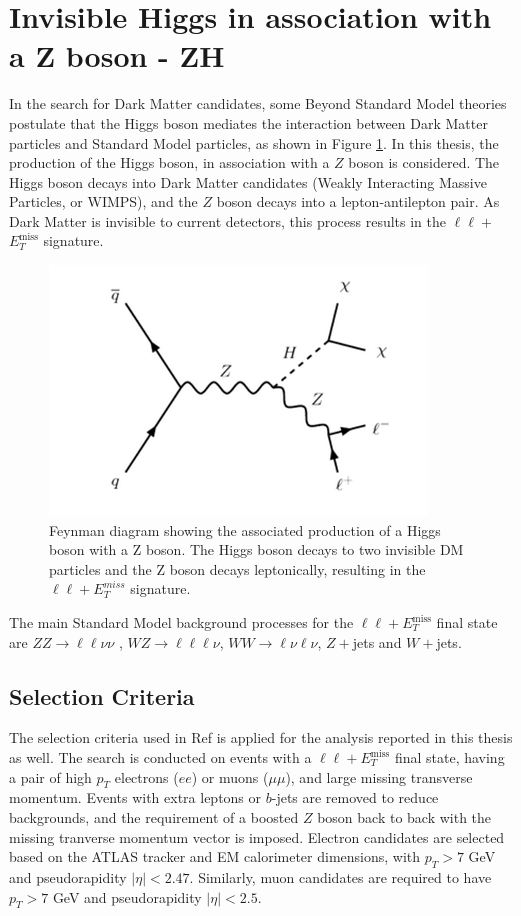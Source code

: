 \documentclass[12pt,a4paper,openright,twoside]{report}
\newcommand{\ZZ}{$ZZ\to \ell\ell\nu\nu$ }
\newcommand{\met}{$E_T^{\mathrm{miss}}$ }
\begin{document}
\section{Invisible Higgs in association with a Z boson - ZH}
In the search for Dark Matter candidates, some Beyond Standard Model theories postulate that the Higgs boson mediates the interaction between Dark Matter particles and Standard Model particles, as shown in Figure \ref{fig:HZ}. In this thesis, the production of the Higgs boson, in association with a $Z$ boson is considered. The Higgs boson decays into Dark Matter candidates (Weakly Interacting Massive Particles, or WIMPS), and the $Z$ boson decays into a lepton-antilepton pair. As Dark Matter is invisible to current detectors, this process results in the $\ell\ell+$\met signature.
\begin{figure}[H]
\centering
	\includegraphics[width=0.5\linewidth]{HZ.png}
	\caption{Feynman diagram showing the associated production of a Higgs boson with a Z boson. The Higgs boson decays to two invisible DM particles and the Z boson decays leptonically, resulting in the $\ell\ell+ E_T^{miss}$ signature.}
		\label{fig:HZ}
\end{figure}
The main Standard Model background processes for the $\ell\ell+$\met final state are \ZZ, $WZ\to \ell\ell\ell\nu$, $WW\to \ell\nu \ell\nu$, $Z+$jets and $W+$jets. 

\subsection{Selection Criteria}
The selection criteria used in Ref \cite{ZH_ATLAS} is applied for the analysis reported in this thesis as well. The search is conducted on events with a $\ell\ell+$\met final state, having a pair of high $p_T$ electrons ($ee$) or muons ($\mu\mu$), and large missing transverse momentum. Events with extra leptons or $b$-jets are removed to reduce backgrounds, and the requirement of a boosted $Z$ boson back to back with the missing tranverse momentum vector is imposed. Electron candidates are selected based on the ATLAS tracker and EM calorimeter dimensions, with $p_T > 7$ GeV and pseudorapidity $|\eta| < 2.47$. Similarly, muon candidates are required to have $p_T > 7$ GeV and pseudorapidity $|\eta| < 2.5$.
\end{document}
